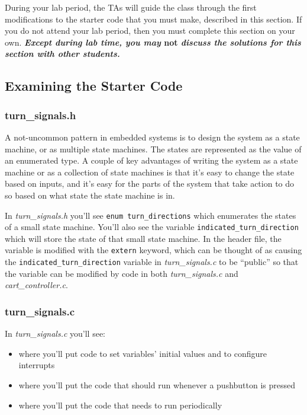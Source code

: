 During your lab period, the TAs will guide the class through the first modifications to the starter code that you must make, described in this section.
If you do not attend your lab period, then you must complete this section on your own.
\textbf{\textit{Except during lab time, you may }not\textit{ discuss the solutions for this section with other students.}}


\subsection{Examining the Starter Code}

\subsubsection{turn\_signals.h}

A not-uncommon pattern in embedded systems is to design the system as a state machine, or as multiple state machines.
The states are represented as the value of an enumerated type.
A couple of key advantages of writing the system as a state machine or as a collection of state machines is that it's easy to change the state based on inputs, and it's easy for the parts of the system that take action to do so based on what state the state machine is in.

In \textit{turn\_signals.h} you'll see \lstinline{enum turn_directions} which enumerates the states of a small state machine.
You'll also see the variable \lstinline{indicated_turn_direction} which will store the state of that small state machine.
In the header file, the variable is modified with the \lstinline{extern} keyword, which can be thought of as causing the \lstinline{indicated_turn_direction} variable in \textit{turn\_signals.c} to be ``public'' so that the variable can be modified by code in both \textit{turn\_signals.c} and \textit{cart\_controller.c}.


\subsubsection{turn\_signals.c}

In \textit{turn\_signals.c} you'll see:
\begin{itemize}
    \item {} where you'll put code to set variables' initial values and to configure interrupts
    \item {} where you'll put the code that should run whenever a pushbutton is pressed
    \item {} where you'll put the code that needs to run periodically
\end{itemize}


